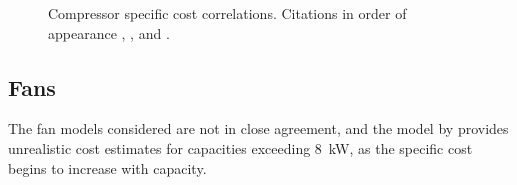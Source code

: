 
        \begin{figure}[H]
            \centering
            
            \caption[Compressor specific cost correlations.]{Compressor specific cost correlations. Citations in order of appearance \cite{Turton2012}, \cite{Smith2005}, and \cite{Duc2007}.}
            \label{fig:prosim_litrev_Compressor_speccost}
        \end{figure}

    \subsection{Fans}
        The fan models considered are not in close agreement, and the model by \citeauthor{Turton2012} \cite{Turton2012} provides unrealistic cost estimates for capacities exceeding \qty{8}{\kW}, as the specific cost begins to increase with capacity.
        \begin{table}[H]
            \caption{Cost correlations for fans.\(\Dot{V}\) is the volumetric flow rate in \unit{\m\cubed\per\s} and \(\Dot{W}\) is the fan power in \unit{\kilo\watt}.}
            \centering 
            \label{table:FanCosts}
            \scalebox{0.8}{
                
            }
            \\[10pt]
        \end{table}


